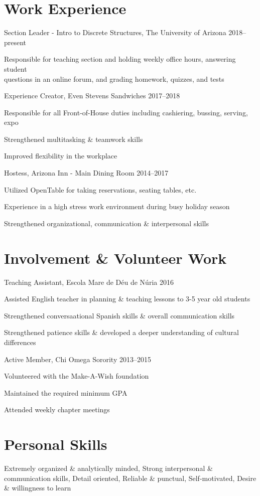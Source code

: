 \documentclass[]{friggeri-cv} %
\begin{document}
\section{Work Experience}
\begin{entrylist}

\entry%
{Section Leader - Intro to Discrete Structures{\normalfont , The University of Arizona}}%
{2018--present}
{%
	\item{Responsible for teaching section and holding weekly office hours, answering student \\ questions in an online forum, and grading homework, quizzes, and tests}
}
\entry
{Experience Creator{\normalfont , Even Stevens Sandwiches}}
{2017--2018}
{%
	\item{Responsible for all Front-of-House duties including cashiering, bussing, serving, expo}
	\item{Strengthened multitasking \& teamwork skills}
	\item{Improved flexibility in the workplace}
}
\entry
{Hostess{\normalfont , Arizona Inn - Main Dining Room}}
{2014--2017}
{%
		\item{Utilized OpenTable for taking reservations, seating tables, etc.}
		\item{Experience in a high stress work environment during busy holiday season}
		\item{Strengthened organizational, communication \& interpersonal skills}%
}


\end{entrylist}

\section{Involvement \& Volunteer Work}
\begin{entrylist}
\entry
{Teaching Assistant{\normalfont , Escola Mare de D\'{e}u de N\'{u}ria}}
{2016}
{
	\item{Assisted English teacher in planning \& teaching lessons to 3-5 year old students}
	\item{Strengthened conversaational Spanish skills \& overall communication skills}
	\item{Strengthened patience skills \& developed a deeper understanding of cultural differences}
}
\entry
{Active Member{\normalfont , Chi Omega Sorority}}
{2013--2015}
{
	\item{Volunteered with the Make-A-Wish foundation}
	\item{Maintained the required minimum GPA}
	\item{Attended weekly chapter meetings}
}
\end{entrylist}

\section{Personal Skills}
\begin{entrylist}
\lineentry
{}{}
{Extremely organized \& analytically minded, Strong interpersonal \& communication skills,
Detail oriented, Reliable \& punctual, Self-motivated, Desire \& willingness to learn}
\end{entrylist}%
\end{document}
